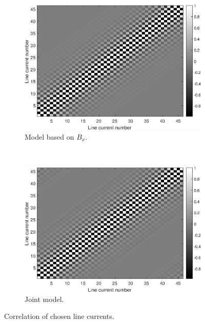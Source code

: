 \begin{figure}[ht]
    ~ %
    \begin{subfigure}[b]{0.45\textwidth}
        \includegraphics[width=\textwidth]{fig/corX.eps}
        \caption{Model based on $B_x$.}
        \label{fig:corX}
    \end{subfigure}
    ~ %
    \begin{subfigure}[b]{0.45\textwidth}
        \includegraphics[width=\textwidth]{fig/corJ.eps}
        \caption{Joint model.}
        \label{fig:corJ}
    \end{subfigure}
    \caption{Correlation of chosen line currents.}
    \label{fig:cor}
\end{figure}

